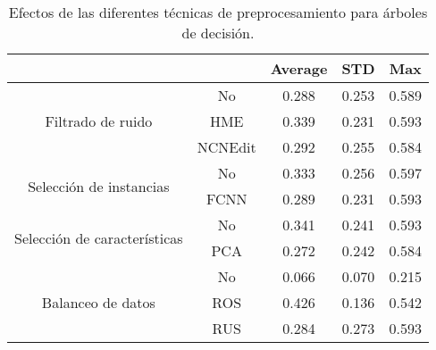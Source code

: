 \begin{table}
    \centering
    \begin{tabular}{cc|c|c|c|}
    \cline{3-5}
    \multicolumn{1}{l}{\textbf{}} & \textbf{} & \multicolumn{1}{c|}{\textbf{Average}} & \multicolumn{1}{c|}{\textbf{STD}} & \textbf{Max} \\ \hline
    \multicolumn{1}{|c|}{\multirow{3}{*}{Filtrado de ruido}}       & No        & 0.288 & 0.253
    & 0.589    \\ \cline{2-5} 
    \multicolumn{1}{|c|}{}  & HME       & 0.339 &  0.231
    & 0.593        \\ \cline{2-5} 
    \multicolumn{1}{|c|}{}  & NCNEdit   & 0.292 &  0.255
    & 0.584        \\ \hline
    \multicolumn{1}{|c|}{\multirow{2}{*}{Selección de instancias}} & No        & 0.333  & 0.256
    & 0.597        \\ \cline{2-5} 
    \multicolumn{1}{|c|}{}  & FCNN      & 0.289 &  0.231
    & 0.593        \\ \hline
    \multicolumn{1}{|c|}{\multirow{2}{*}{Selección de características}} & No        & 0.341  &  0.241
    & 0.593        \\ \cline{2-5} 
    \multicolumn{1}{|c|}{}  & PCA      & 0.272  & 0.242
    & 0.584        \\ \hline
    \multicolumn{1}{|c|}{\multirow{3}{*}{Balanceo de datos}}       & No        & 0.066  &  0.070
    & 0.215        \\ \cline{2-5} 
    \multicolumn{1}{|c|}{}  & ROS       & 0.426 &  0.136
    & 0.542        \\ \cline{2-5} 
    \multicolumn{1}{|c|}{}  & RUS       & 0.284 &  0.273
    & 0.593        \\ \hline
    \end{tabular}
    \caption{Efectos de las diferentes técnicas de preprocesamiento para árboles de decisión.}
    \label{dt}
\end{table}

